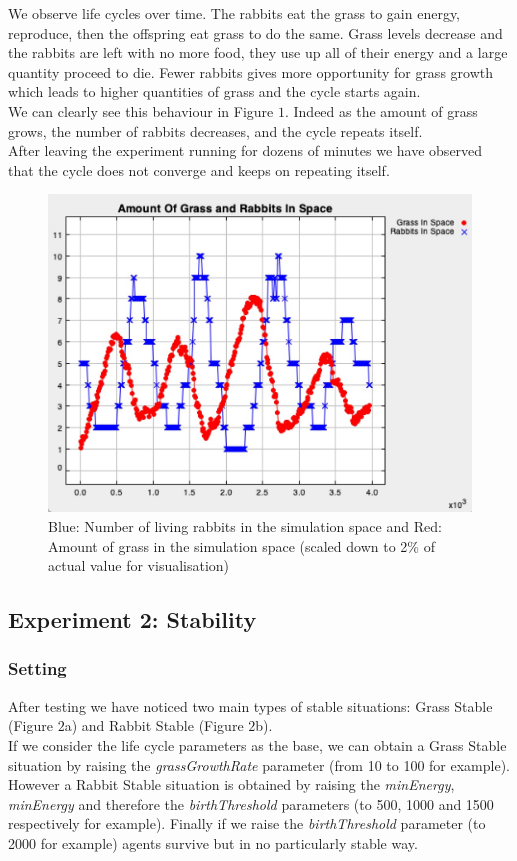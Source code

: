 \documentclass[11pt]{article}
\begin{document}
We observe life cycles over time. The rabbits eat the grass to gain energy, reproduce, then the offspring eat grass to do the same. Grass levels decrease and the rabbits are left with no more food, they use up all of their energy and a large quantity proceed to die. Fewer rabbits gives more opportunity for grass growth which leads to higher quantities of grass and the cycle starts again. \\
\indent We can clearly see this behaviour in Figure $1$. Indeed as the amount of grass grows, the number of rabbits decreases, and the cycle repeats itself. \\
\indent After leaving the experiment running for dozens of minutes we have observed that the cycle does not converge and keeps on repeating itself.

\begin{figure}[ht] 
        \centering \includegraphics[width=0.5\columnwidth, frame]{Fig1.png}
        \caption{
                \label{fig:1}
                Blue: Number of living rabbits in the simulation space and Red: Amount of grass in the simulation space (scaled down to 2\% of actual value for visualisation)
        }
\end{figure}


\subsection{Experiment 2: Stability}

\subsubsection{Setting}

After testing we have noticed two main types of stable situations: Grass Stable (Figure $2$a) and Rabbit Stable (Figure $2$b). \\
\indent If we consider the life cycle parameters as the base, we can obtain a Grass Stable situation by raising the \textit{grassGrowthRate} parameter (from 10 to 100 for example).\\
\indent However a Rabbit Stable situation is obtained by raising the \textit{minEnergy}, \textit{minEnergy} and therefore the \textit{birthThreshold} parameters (to 500, 1000 and 1500 respectively for example).
\indent Finally if we raise the \textit{birthThreshold} parameter (to 2000 for example) agents survive but in no particularly stable way.
\end{document}
